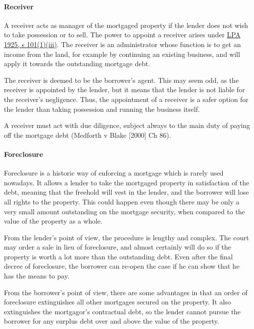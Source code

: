 \documentclass[
]{article}
\begin{document}
\hypertarget{receiver}{%
\paragraph{Receiver}\label{receiver}}

A receiver acts as manager of the mortgaged property if the lender does
not wish to take possession or to sell. The power to appoint a receiver
arises under
\href{https://www.legislation.gov.uk/ukpga/Geo5/15-16/20/section/101}{LPA
1925, s 101(1)(iii)}. The receiver is an administrator whose function is
to get an income from the land, for example by continuing an existing
business, and will apply it towards the outstanding mortgage debt.

The receiver is deemed to be the borrower's agent. This may seem odd, as
the receiver is appointed by the lender, but it means that the lender is
not liable for the receiver's negligence. Thus, the appointment of a
receiver is a safer option for the lender than taking possession and
running the business itself.

A receiver must act with due diligence, subject always to the main duty
of paying off the mortgage debt (Medforth v Blake {[}2000{]} Ch 86).

\hypertarget{foreclosure}{%
\paragraph{Foreclosure}\label{foreclosure}}

Foreclosure is a historic way of enforcing a mortgage which is rarely
used nowadays. It allows a lender to take the mortgaged property in
satisfaction of the debt, meaning that the freehold will vest in the
lender, and the borrower will lose all rights to the property. This
could happen even though there may be only a very small amount
outstanding on the mortgage security, when compared to the value of the
property as a whole.

From the lender's point of view, the procedure is lengthy and complex.
The court may order a sale in lieu of foreclosure, and almost certainly
will do so if the property is worth a lot more than the outstanding
debt. Even after the final decree of foreclosure, the borrower can
re-open the case if he can show that he has the means to pay.

From the borrower's point of view, there are some advantages in that an
order of foreclosure extinguishes all other mortgages secured on the
property. It also extinguishes the mortgagor's contractual debt, so the
lender cannot pursue the borrower for any surplus debt over and above
the value of the property.
\end{document}

